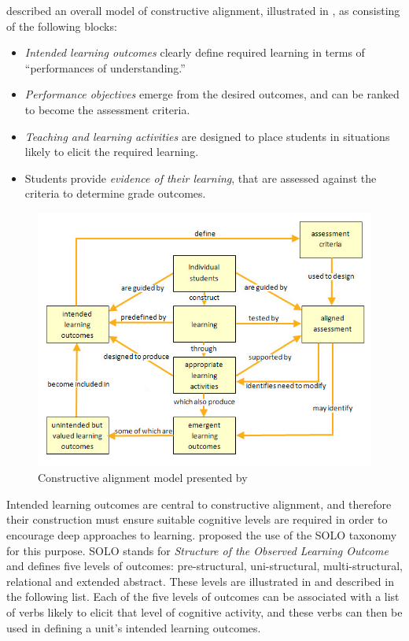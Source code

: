 \citet{Houghton:2004} described an overall model of constructive alignment, illustrated in , as consisting of the following blocks:
\begin{itemize}[noitemsep,nolistsep]
	\item \emph{Intended learning outcomes} clearly define required learning in terms of ``performances of understanding.''
	\item \emph{Performance objectives} emerge from the desired outcomes, and can be ranked to become the assessment criteria.
	\item \emph{Teaching and learning activities} are designed to place students in situations likely to elicit the required learning.
	\item Students provide \emph{evidence of their learning}, that are assessed against the criteria to determine grade outcomes.
\end{itemize}

\begin{figure}[htpb]
	\centering 
	\includegraphics[width=\columnwidth]{Houghton_constructive_alignment_1}
	\caption{Constructive alignment model presented by \citet{Houghton:2004}}
	\label{fig:Houghton}
\end{figure}

Intended learning outcomes are central to constructive alignment, and therefore their construction must ensure suitable cognitive levels are required in order to encourage deep approaches to learning. \citet{Biggs:1996c} proposed the use of the SOLO taxonomy \cite{Biggs:1982} for this purpose. SOLO stands for \emph{Structure of the Observed Learning Outcome} and defines five levels of outcomes: pre-structural, uni-structural, multi-structural, relational and extended abstract. These levels are illustrated in  and described in the following list. Each of the five levels of outcomes can be associated with a list of verbs likely to elicit that level of cognitive activity, and these verbs can then be used in defining a unit's intended learning outcomes.

